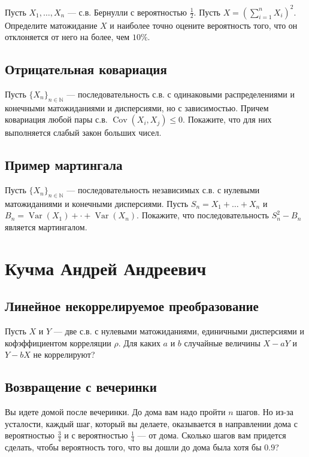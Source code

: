 \documentclass[12pt]{article}
\newcommand\N{\mathbb{N}}
\DeclareMathOperator{\Var}{Var}
\DeclareMathOperator{\Cov}{Cov}
\begin{document}
Пусть $X_1, \dots, X_n$ --- с.в. Бернулли с вероятностью $\frac{1}{2}$. Пусть $X = (\sum_{i = 1}^n X_i)^2$. Определите матожидание $X$ и наиболее точно оцените вероятность того, что он отклоняется от него на более, чем $10\%$.


\subsection{Отрицательная ковариация}

Пусть $\{X_n\}_{n \in \N}$ --- последовательность с.в. с одинаковыми распределениями и конечными матожиданиями и дисперсиями, но с зависимостью. Причем ковариация любой пары с.в. $\Cov(X_i, X_j) \le 0$. Покажите, что для них выполняется слабый закон больших чисел.


\subsection{Пример мартингала}

Пусть $\{X_n\}_{n \in \N}$ --- последовательность независимых с.в. с нулевыми матожиданиями и конечными дисперсиями. Пусть $S_n = X_1 + \dots + X_n$ и $B_n = \Var(X_1) + \cdot + \Var(X_n)$. Покажите, что последовательность $S_n^2 - B_n$ является мартингалом.


\newpage
\section{Кучма Андрей Андреевич}

\subsection{Линейное некоррелируемое преобразование}

Пусть $X$ и $Y$ --- две с.в. с нулевыми матожиданиями, единичными дисперсиями и кофэффициентом корреляции $\rho$. Для каких $a$ и $b$ случайные величины $X - aY$ и $Y - bX$ не коррелируют?


\subsection{Возвращение с вечеринки}

Вы идете домой после вечеринки. До дома вам надо пройти $n$ шагов. Но из-за усталости, каждый шаг, который вы делаете, оказывается в направлении дома с вероятностью $\frac{3}{4}$ и с вероятностью $\frac{1}{4}$ --- от дома. Сколько шагов вам придется сделать, чтобы вероятность того, что вы дошли до дома была хотя бы $0.9$?
\end{document}
